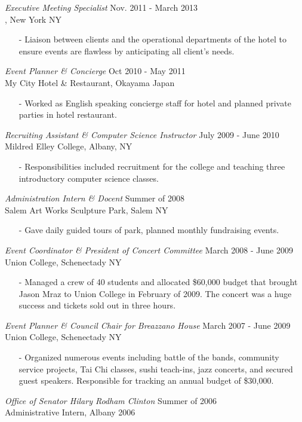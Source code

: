 \documentclass[margin, 10pt]{res} %
\begin{document}
\begin{resume}
{\sl Executive Meeting Specialist} \hfill Nov. 2011 - March 2013\\
\sheraton, New York NY
\begin{itemize} \itemsep -2pt
\item[-] Liaison between clients and the operational departments of the hotel to ensure events are flawless by anticipating all client's needs.
\end{itemize}

{\sl Event Planner \& Concierge} \hfill Oct 2010 - May 2011 \\
My City Hotel \& Restaurant, Okayama Japan
\begin{itemize} \itemsep -2pt
\item[-] Worked as English speaking concierge staff for hotel and planned private parties in hotel restaurant.
\end{itemize}

{\sl Recruiting Assistant \& Computer Science Instructor} \hfill July 2009 - June 2010 \\
Mildred Elley College, Albany, NY
\begin{itemize} \itemsep -2pt
\item[-] Responsibilities included recruitment for the college and teaching three introductory computer science classes.
\end{itemize}

{\sl Administration Intern \& Docent} \hfill Summer of 2008 \\
Salem Art Works Sculpture Park, Salem NY
\begin{itemize} \itemsep -2pt
\item[-] Gave daily guided tours of park, planned monthly fundraising events. 
\end{itemize}

{\sl Event Coordinator \& President of Concert Committee} \hfill March 2008 - June 2009 \\
Union College, Schenectady NY
\begin{itemize} \itemsep -2pt
\item[-] Managed a crew of 40 students and allocated \$60,000 budget that brought Jason Mraz to Union College in February of 2009. The concert was a huge success and tickets sold out in three hours.
\end{itemize}

{\sl Event Planner \& Council Chair for Breazzano House} \hfill March 2007 - June 2009 \\
Union College, Schenectady NY
\begin{itemize} \itemsep -2pt
\item[-] Organized numerous events including battle of the bands, community service projects, Tai Chi classes, sushi teach-ins, jazz concerts, and secured guest speakers.  Responsible for tracking an annual budget of \$30,000.
\end{itemize}

{\sl Office of Senator Hilary Rodham Clinton} \hfill Summer of 2006 \\
Administrative Intern, Albany 2006

\end{resume}
\end{document}
